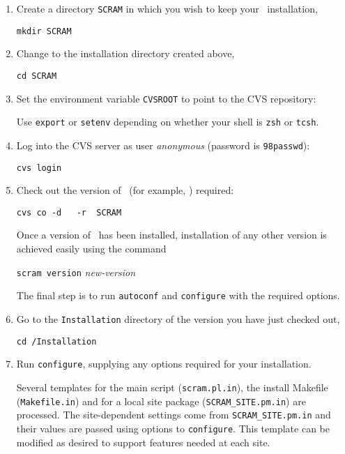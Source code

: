 \begin{enumerate}
\item Create a directory \texttt{SCRAM} in which you wish to keep your
  \scram\ installation,\mbox{}
  
  \eg \texttt{mkdir SCRAM}
  
\item Change to the installation directory created above,\mbox{}
  
  \eg \texttt{cd SCRAM}
\item Set the environment variable \texttt{CVSROOT} to point to the
  CVS repository:\mbox{}

  \scramcvsrepository
  
  Use \texttt{export} or \texttt{setenv} depending on whether your
  shell is \texttt{zsh} or \texttt{tcsh}.
  
\item Log into the CVS server as user \textit{anonymous} (password is
  \texttt{98passwd}):\mbox{}
  
  \texttt{cvs login}
  
\item Check out the version of \scram\ (for example, \thisrelease)
  required:\mbox{}
  
  \texttt{cvs co -d \thisrelease~ -r \thisrelease ~SCRAM}
  
  Once a version of \scram\ has been installed, installation 
  of any other version is achieved easily using the command\mbox{}
  
  \texttt{scram version} \textit{new-version}
  
  The final step is to run \texttt{autoconf} and \texttt{configure}
  with the required options.
  
\item Go to the \texttt{Installation} directory of the version you have
  just checked out,\mbox{}
  
  \eg \texttt{cd \thisrelease/Installation}
  
\item Run \texttt{configure}, supplying any options required for your installation.\mbox{}
  
  Several templates for the main script (\texttt{scram.pl.in}), the
  install Makefile (\texttt{Makefile.in}) and for a local site package 
  (\texttt{SCRAM\_SITE.pm.in}) are processed.
  The site-dependent settings come from \texttt{SCRAM\_SITE.pm.in} and 
  their values are passed using options to \texttt{configure}. This
  template can be modified as desired to support features needed at each site.
  

\end{enumerate}
